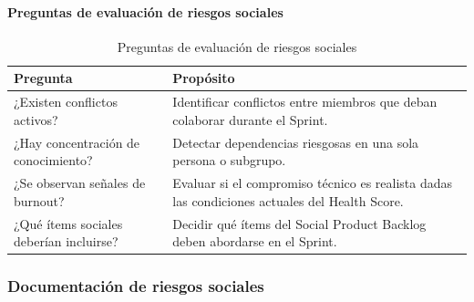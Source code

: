 \FloatBarrier

\paragraph{Preguntas de evaluación de riesgos sociales}

\begin{table}[h]
    \centering
    \small
    \begin{tabularx}{\textwidth}{|X|X|}
        \hline
        \textbf{Pregunta} & \textbf{Propósito}                                                                            \\
        \hline
        ¿Existen conflictos activos?
                          & Identificar conflictos entre miembros que deban colaborar durante el Sprint.                  \\
        \hline
        ¿Hay concentración de conocimiento?
                          & Detectar dependencias riesgosas en una sola persona o subgrupo.                               \\
        \hline
        ¿Se observan señales de burnout?
                          & Evaluar si el compromiso técnico es realista dadas las condiciones actuales del Health Score. \\
        \hline
        ¿Qué ítems sociales deberían incluirse?
                          & Decidir qué ítems del Social Product Backlog deben abordarse en el Sprint.                    \\
        \hline
    \end{tabularx}
    \caption{Preguntas de evaluación de riesgos sociales}
    \label{tab:preguntas-riesgos-sociales}
\end{table}

\FloatBarrier

\subsubsection{Documentación de riesgos sociales}

